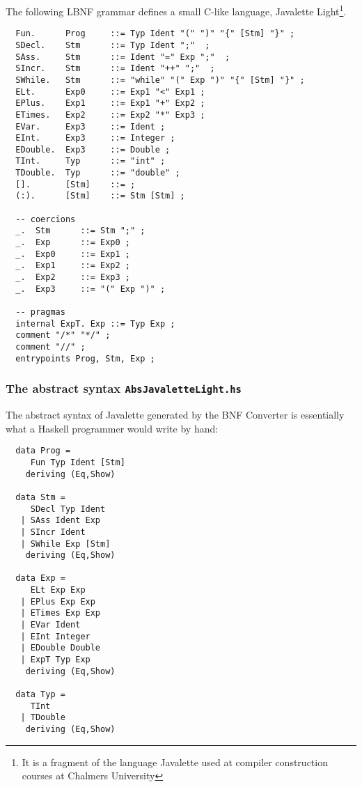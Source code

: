 \documentclass[10pt]{article}
\begin{document}
The following LBNF grammar defines a small C-like language, 
Javalette Light\footnote{It is a fragment of the
language Javalette used at compiler construction courses at Chalmers University}.
\small
\begin{verbatim}
  Fun.      Prog     ::= Typ Ident "(" ")" "{" [Stm] "}" ;
  SDecl.    Stm      ::= Typ Ident ";"  ;
  SAss.     Stm      ::= Ident "=" Exp ";"  ;
  SIncr.    Stm      ::= Ident "++" ";"  ;
  SWhile.   Stm      ::= "while" "(" Exp ")" "{" [Stm] "}" ;
  ELt.      Exp0     ::= Exp1 "<" Exp1 ;
  EPlus.    Exp1     ::= Exp1 "+" Exp2 ;
  ETimes.   Exp2     ::= Exp2 "*" Exp3 ;
  EVar.     Exp3     ::= Ident ;
  EInt.     Exp3     ::= Integer ;
  EDouble.  Exp3     ::= Double ;
  TInt.     Typ      ::= "int" ;
  TDouble.  Typ      ::= "double" ;
  [].       [Stm]    ::= ;
  (:).      [Stm]    ::= Stm [Stm] ;

  -- coercions
  _.  Stm      ::= Stm ";" ;
  _.  Exp      ::= Exp0 ;
  _.  Exp0     ::= Exp1 ;
  _.  Exp1     ::= Exp2 ;
  _.  Exp2     ::= Exp3 ;
  _.  Exp3     ::= "(" Exp ")" ;

  -- pragmas
  internal ExpT. Exp ::= Typ Exp ;
  comment "/*" "*/" ;
  comment "//" ;
  entrypoints Prog, Stm, Exp ;
\end{verbatim}

\normalsize


\subsubsection{The abstract syntax {\tt AbsJavaletteLight.hs}}

The abstract syntax of Javalette generated by the
BNF Converter is essentially what a Haskell programmer would write by hand:
\small
\begin{verbatim}
  data Prog =
     Fun Typ Ident [Stm]
    deriving (Eq,Show)

  data Stm =
     SDecl Typ Ident
   | SAss Ident Exp
   | SIncr Ident
   | SWhile Exp [Stm]
    deriving (Eq,Show)

  data Exp =
     ELt Exp Exp
   | EPlus Exp Exp
   | ETimes Exp Exp
   | EVar Ident
   | EInt Integer
   | EDouble Double
   | ExpT Typ Exp
    deriving (Eq,Show)

  data Typ =
     TInt
   | TDouble
    deriving (Eq,Show)
\end{verbatim}
\normalsize
\end{document}
